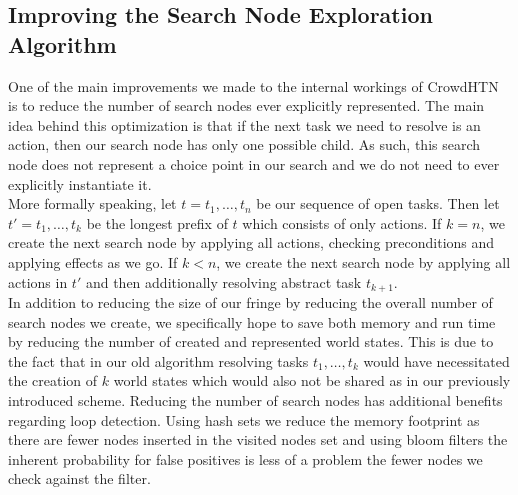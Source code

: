 \subsection{Improving the Search Node Exploration Algorithm}
One of the main improvements we made to the internal workings of CrowdHTN is to reduce the number of search nodes ever explicitly represented. The main idea behind this optimization is that if the next task we need to resolve is an action, then our search node has only one possible child. As such, this search node does not represent a choice point in our search and we do not need to ever explicitly instantiate it. \\
More formally speaking, let $t = t_1, \ldots, t_n$ be our sequence of open tasks. Then let $t' = t_1, \ldots, t_k$ be the longest prefix of $t$ which consists of only actions. If $k = n$, we create the next search node by applying all actions, checking preconditions and applying effects as we go. If $k < n$, we create the next search node by applying all actions in $t'$ and then additionally resolving abstract task $t_{k+1}$. \\
In addition to reducing the size of our fringe by reducing the overall number of search nodes we create, we specifically hope to save both memory and run time by reducing the number of created and represented world states. This is due to the fact that in our old algorithm resolving tasks $t_1, \ldots, t_k$ would have necessitated the creation of $k$ world states which would also not be shared as in our previously introduced scheme. Reducing the number of search nodes has additional benefits regarding loop detection. Using hash sets we reduce the memory footprint as there are fewer nodes inserted in the visited nodes set and using bloom filters the inherent probability for false positives is less of a problem the fewer nodes we check against the filter.
\begin{comment}
- first task in task network may be action
- then there is only one possible child
- the search node is not actually interesting in that it does not represent a choice point in our graph
- new definition of a search step: for sequence of open tasks $t_1, \ldots, t_k$, let $t_1, \ldots, t_m$ be the longest prefix consisting of all actions
\end{comment}
